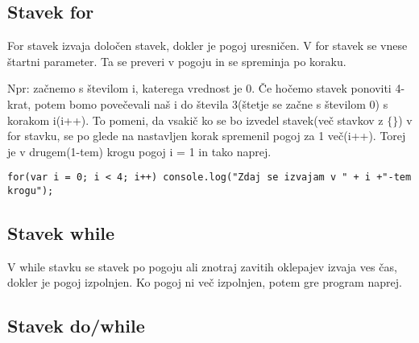 \subsection{Stavek for}

{\centering{}\par}

For stavek izvaja določen stavek, dokler je pogoj uresničen. V for stavek se vnese štartni parameter. Ta se preveri v pogoju in se spreminja po koraku.

{\centering{}\par}
\pagebreak
Npr: začnemo s številom i, katerega vrednost je 0. Če hočemo stavek ponoviti 4-krat, potem bomo povečevali naš i do števila 3(štetje se začne s številom 0) s korakom i(i++). To pomeni, da vsakič ko se bo izvedel stavek(več stavkov z $\{\}$) v for stavku, se po glede na nastavljen korak spremenil pogoj za 1 več(i++). Torej je v drugem(1-tem) krogu pogoj i = 1 in tako naprej.

\begin{verbatim}
for(var i = 0; i < 4; i++) console.log("Zdaj se izvajam v " + i +"-tem krogu");
\end{verbatim}

\subsection{Stavek while}

{\centering{}\par}

V while stavku se stavek po pogoju ali znotraj zavitih oklepajev izvaja ves čas, dokler je pogoj izpolnjen. Ko pogoj ni več izpolnjen, potem gre program naprej.



\subsection{Stavek do/while}


